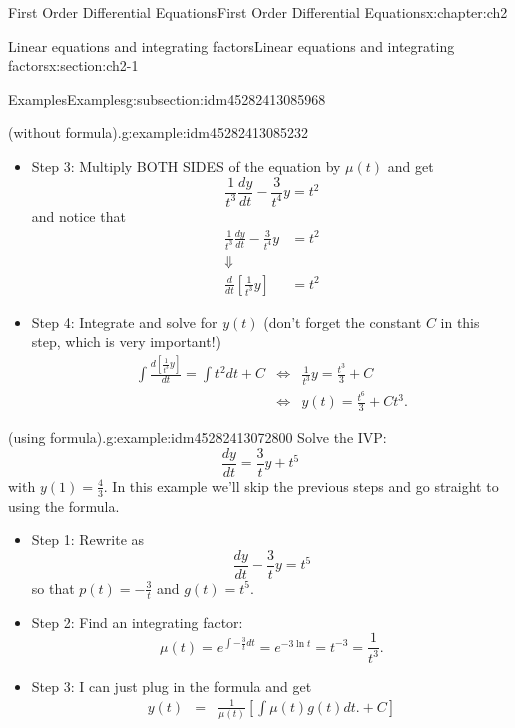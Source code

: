 \documentclass[oneside,10pt,]{book}
\numberwithin{equation}{section}
\numberwithin{equation}{section}
\newcommand{\amp}{&}
\begin{document}
\begin{chapterptx}{First Order Differential Equations}{}{First Order Differential Equations}{}{}{x:chapter:ch2}
\begin{sectionptx}{Linear equations and integrating factors}{}{Linear equations and integrating factors}{}{}{x:section:ch2-1}
\begin{subsectionptx}{Examples}{}{Examples}{}{}{g:subsection:idm45282413085968}
\begin{example}{(without formula).}{g:example:idm45282413085232}
\begin{itemize}[label=\textbullet]
Note we only need an integrating factor, not a general integrating factor. So we never need to have a \(+C\) in this step! In the next step we will note that we also don't need the absolute value inside the natural log (why not?).%
\item{}Step 3: Multiply BOTH SIDES of the equation by \(\mu(t)\) and get%
\begin{equation*}
\frac{1}{t^{3}}\frac{dy}{dt}-\frac{3}{t^{4}}y=t^{2}
\end{equation*}
and notice that%
\begin{align*}
\frac{1}{t^{3}}\frac{dy}{dt}-\frac{3}{t^{4}}y \amp =t^{2}\\
\Downarrow\\
\frac{d}{dt} \left[\frac{1}{t^{3}}y\right]\amp =t^{2}
\end{align*}
%
\item{}Step 4: Integrate and solve for \(y(t)\) (don't forget the constant \(C\) in this step, which is very important!)%
\begin{align*}
\int\frac{d\left[\frac{1}{t^{3}}y\right]}{dt}=\int t^{2}dt+C \amp \iff \amp \frac{1}{t^{3}}y=\frac{t^{3}}{3}+C\\
\amp \iff \amp y(t)=\frac{t^{6}}{3}+Ct^{3}.
\end{align*}
%
\end{itemize}
\end{example}
\begin{example}{(using formula).}{g:example:idm45282413072800}%
Solve the IVP:%
\begin{equation*}
\frac{dy}{dt}=\frac{3}{t}y+t^{5}
\end{equation*}
with \(y(1)=\frac{4}{3}\). In this example we'll skip the previous steps and go straight to using the formula.%
%
\begin{itemize}[label=\textbullet]
\item{}Step 1: Rewrite as%
\begin{equation*}
\frac{dy}{dt}-\frac{3}{t}y=t^{5}
\end{equation*}
so that \(p(t)=-\frac{3}{t}\) and \(g(t)=t^{5}\).%
\item{}Step 2: Find an integrating factor:%
\begin{equation*}
\mu(t)=e^{\int-\frac{3}{t}dt}=e^{-3\ln t}=t^{-3}=\frac{1}{t^{3}}.
\end{equation*}
%
\item{}Step 3: I can just plug in the formula and get%
\begin{align*}
y(t) \amp = \amp \frac{1}{\mu(t)}\left[\int\mu(t)g(t)dt.+C\right]\\

\end{align*}
\end{itemize}
\end{example}
\end{subsectionptx}
\end{sectionptx}
\end{chapterptx}
\end{document}

